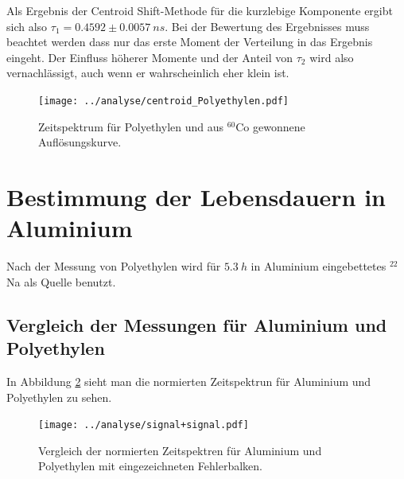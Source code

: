 \documentclass[a4paper,12pt]{article}
\begin{document}
Als Ergebnis der Centroid Shift-Methode für die kurzlebige Komponente ergibt sich also $τ_1 = 0.4592 \pm \SI{0.0057}{ns}$. Bei der Bewertung des Ergebnisses muss beachtet werden dass nur das 
erste Moment der Verteilung in das Ergebnis eingeht. Der Einfluss höherer Momente und der Anteil von $τ_2$ wird also vernachlässigt, auch wenn er wahrscheinlich eher klein ist.
\begin{figure}
	\texttt{[image: ../analyse/centroid\_Polyethylen.pdf]}
	\caption{Zeitspektrum für Polyethylen und aus $^{60}$Co gewonnene Auflösungskurve. }
	\label{fig:compare_signal}
\end{figure}
 
\section{Bestimmung der Lebensdauern in Aluminium}
Nach der Messung von Polyethylen wird für $\SI{5.3}{h}$ in Aluminium eingebettetes $^{22}$Na als Quelle benutzt.

\subsection{Vergleich der Messungen für Aluminium und Polyethylen}
In Abbildung \ref{fig:compare_signal} sieht man die normierten Zeitspektrun für Aluminium und
Polyethylen zu sehen.
\begin{figure}[h]
	\texttt{[image: ../analyse/signal+signal.pdf]}
	\caption{Vergleich der normierten Zeitspektren für Aluminium und Polyethylen mit eingezeichneten Fehlerbalken.}
	\label{fig:compare_signal}
\end{figure}
\end{document}
